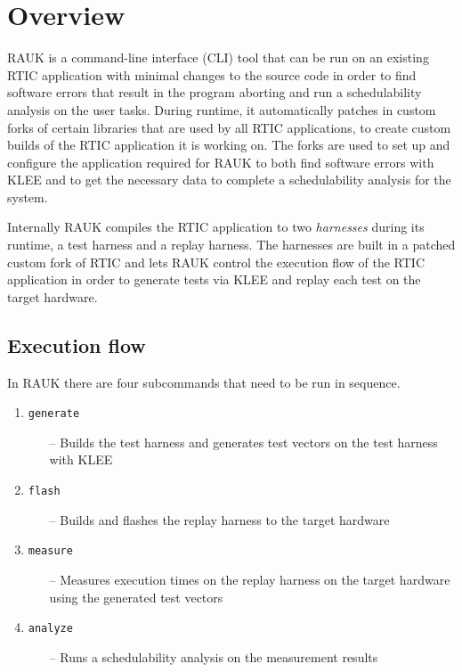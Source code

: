 \section{Overview}
RAUK is a command-line interface (CLI) tool that can be run on an existing
RTIC application with minimal changes to the source code in order to find software 
errors that result in the program aborting and run a
schedulability analysis on the user tasks. During runtime, it automatically
patches in custom forks of certain libraries that are used by all RTIC
applications, to create custom builds of the RTIC application it is working on.
The forks are used to set up and configure the application required for RAUK to both
find software errors with KLEE and to get the necessary data to complete a 
schedulability analysis for the system.

Internally RAUK compiles the RTIC application to two \emph{harnesses} during
its runtime, a test harness and a replay harness. The harnesses are built in a
patched custom fork of RTIC and lets RAUK control the execution flow of the
RTIC application in order to generate tests via KLEE and replay each test on
the target hardware.

\subsection{Execution flow}
In RAUK there are four subcommands that need to be run in sequence.

\begin{enumerate}
    \item \texttt{generate}
    \begin{itemize}
        \item [--] Builds the test harness and generates test vectors on the test
            harness with KLEE
    \end{itemize}
    \item \texttt{flash}
    \begin{itemize}
        \item [--] Builds and flashes the replay harness to the target hardware
    \end{itemize}
    \item \texttt{measure}
    \begin{itemize}
        \item [--] Measures execution times on the replay harness on the target
            hardware using the generated test vectors
    \end{itemize}
    \item \texttt{analyze}
    \begin{itemize}
        \item [--] Runs a schedulability analysis on the measurement results
    \end{itemize}
\end{enumerate}

